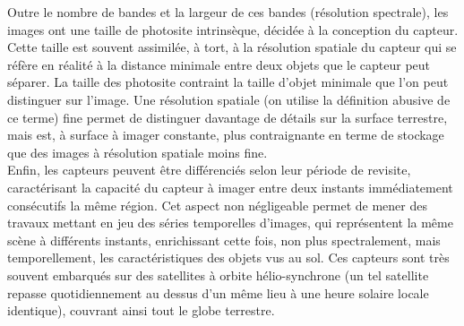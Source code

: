 Outre le nombre de bandes et la largeur de ces bandes (résolution spectrale), les images ont une taille de photosite intrinsèque, décidée à la conception du capteur. Cette taille est souvent assimilée, à tort, à la résolution spatiale du capteur qui se réfère en réalité à la distance minimale entre deux objets que le capteur peut séparer. La taille des photosite contraint la taille d'objet minimale que l'on peut distinguer sur l'image. Une résolution spatiale (on utilise la définition abusive de ce terme) fine permet de distinguer davantage de détails sur la surface terrestre, mais est, à surface à imager constante, plus contraignante en terme de stockage que des images à résolution spatiale moins fine.\\
Enfin, les capteurs peuvent être différenciés selon leur période de revisite, caractérisant la capacité du capteur à imager entre deux instants immédiatement consécutifs la même région. Cet aspect non négligeable permet de mener des travaux mettant en jeu des séries temporelles d'images, qui représentent la même scène à différents instants, enrichissant cette fois, non plus spectralement, mais temporellement, les caractéristiques des objets vus au sol. Ces capteurs sont très souvent embarqués sur des satellites à orbite hélio-synchrone (un tel satellite repasse quotidiennement au dessus d'un même lieu à une heure solaire locale identique), couvrant ainsi tout le globe terrestre.


